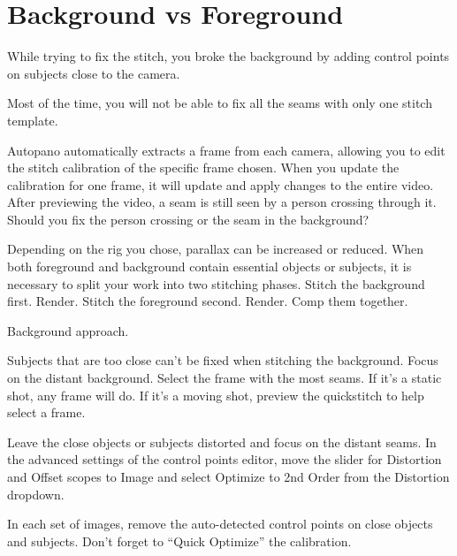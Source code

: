 \section{Background vs Foreground}
\pagecolor{white}
\label{chap:34}
\begin{fullwidth}

\problem

{\large While trying to fix the stitch, you broke the background by adding control points on subjects close to the camera. \par}

Most of the time, you will not be able to fix all the seams with only one stitch template. 

Autopano automatically extracts a frame from each camera, allowing you to edit the stitch calibration of the specific frame chosen. When you update the calibration for one frame, it will update and apply changes to the entire video. After previewing the video, a seam is still seen by a person crossing through it. Should you fix the person crossing or the seam in the background?


\clearpage
\solutions

Depending on the rig you chose, parallax can be increased or reduced. When both foreground and background contain essential objects or subjects, it is necessary to split your work into two stitching phases. Stitch the background first. Render. Stitch the foreground second. Render. Comp them together.

{\large Background approach. \par}

Subjects that are too close can’t be fixed when stitching the background. Focus on the distant background. Select the frame with the most seams. If it’s a static shot, any frame will do. If it’s a moving shot, preview the quickstitch to help select a frame. 

Leave the close objects or subjects distorted and focus on the distant seams. In the advanced settings of the control points editor, move the slider for Distortion and Offset scopes to Image and select Optimize to 2nd Order from the Distortion dropdown. 

\clearpage
In each set of images, remove the auto-detected control points on close objects and subjects. Don’t forget to “Quick Optimize” the calibration. 



\end{fullwidth}
